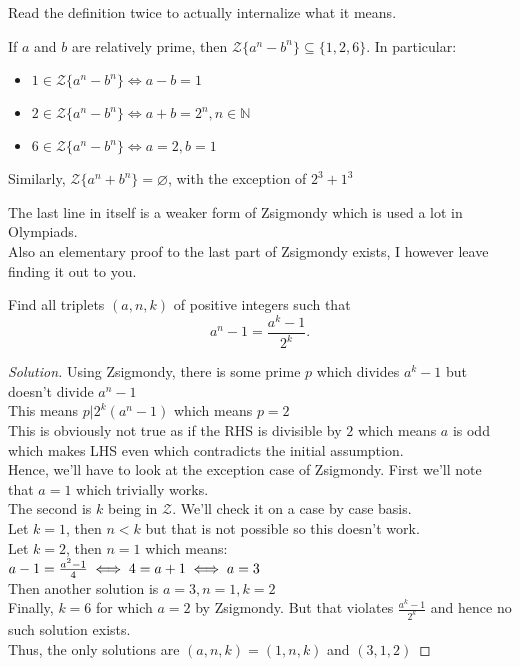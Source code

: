 Read the definition twice to actually internalize what it means.\\
\begin{theorem}
    If $a$ and $b$ are relatively prime, then $\mathcal{Z}\{a^n-b^n\} \subseteq \{1,2,6\}$. In particular:
    \begin{itemize}
        \item $1 \in \mathcal{Z}\{a^n-b^n\} \iff a-b=1$\\
        \item $2 \in \mathcal{Z}\{a^n-b^n\} \iff a+b=2^n, n \in \mathbb{N}$\\
        \item $6 \in \mathcal{Z}\{a^n-b^n\} \iff a=2, b=1$
    \end{itemize}
Similarly, $\mathcal{Z}\{a^n+b^n\}=\varnothing$, with the exception of $2^3 + 1^3$
\end{theorem}
The last line in itself is a weaker form of Zsigmondy which is used a lot in Olympiads.\\
Also an elementary proof to the last part of Zsigmondy exists, I however leave finding it out to you.\\
\begin{example}
    Find all triplets $(a, n, k)$ of positive integers such that\\
$$a^n-1=\frac{a^k-1}{2^k}.$$
\end{example}
\begin{proof}
    [Solution]
    Using Zsigmondy, there is some prime $p$ which divides $a^k-1$ but doesn't divide $a^n-1$\\
    This means $p|2^k(a^n-1)$ which means $p=2$\\
    This is obviously not true as if the RHS is divisible by $2$ which means $a$ is odd which makes LHS even which contradicts the initial assumption.\\
Hence, we'll have to look at the exception case of Zsigmondy. First we'll note that $a=1$ which trivially works.\\
The second is $k$ being in $\mathcal{Z}$. We'll check it on a case by case basis.\\
Let $k=1$, then $n<k$ but that is not possible so this doesn't work.\\
Let $k=2$, then $n=1$ which means:\\
$a-1=\frac{a^2-1}{4}\\
\iff 4=a+1\\
\iff a=3$\\
Then another solution is $a=3, n=1, k=2$\\
Finally, $k=6$ for which $a=2$ by Zsigmondy. But that violates $\frac{a^k-1}{2^k}$ and hence no such solution exists.\\
Thus, the only solutions are $(a,n,k)=(1,n,k)$ and $(3,1,2)$
\end{proof}
